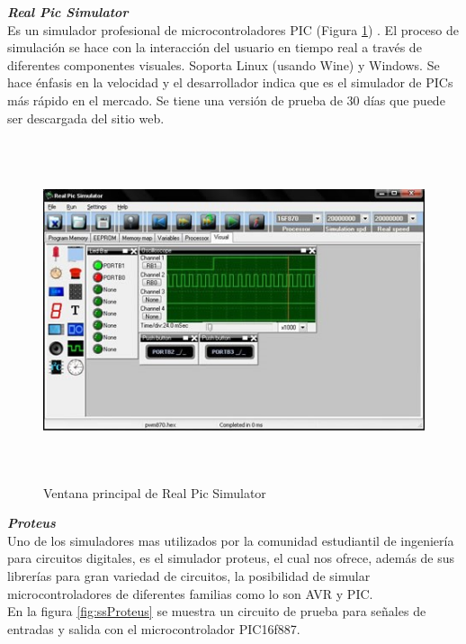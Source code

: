 \documentclass[12pt,a4paper]{article}
\begin{document}
   
   \textbf{\textit{Real Pic Simulator}}\\
   Es un simulador profesional de microcontroladores PIC (Figura \ref{fig:realPIC}) . El proceso de simulación se hace con la interacción del usuario en tiempo real a través de diferentes componentes visuales. Soporta Linux (usando Wine) y Windows. Se hace énfasis en la velocidad y el desarrollador indica que es el simulador de PICs más rápido en el mercado. Se tiene una versión de prueba de 30 días que puede ser descargada del sitio web.
   \begin{figure}[htpb]
   \centering
   \includegraphics[height=10cm]{realPIC}
   \caption{Ventana principal de Real Pic Simulator}
   \label{fig:realPIC}
   \end{figure}
   
   \textbf{\textit{Proteus}}\\
   Uno de los simuladores mas utilizados por la comunidad estudiantil de ingeniería para circuitos digitales, es el simulador proteus, el cual nos ofrece, además de sus librerías para gran variedad de circuitos, la posibilidad de simular microcontroladores de diferentes familias como lo son AVR y PIC. \\
   En la figura \ref{fig:ssProteus} se muestra un circuito de prueba para señales de entradas y salida con el microcontrolador PIC16f887.\\
   
\end{document}
